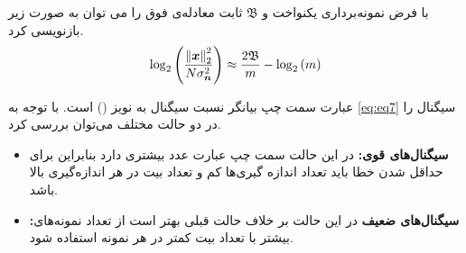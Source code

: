 با فرض نمونه‌برداری یکنواخت و
$ \mathfrak{B} $
ثابت معادله‌ی فوق را می توان به صورت زیر بازنویسی کرد.
\begin{align}
\label{eq:eq8}
\log_{2}\left( \dfrac{\left\lVert\bm{x}\right\rVert_{2}^{2}}{N \sigma^{2}_{\bm{n}}}\right)\approx \dfrac{2\mathfrak{B}}{m}-\log_{2}\left(m\right)
\end{align}

عبارت سمت چپ بیانگر نسبت سیگنال به نویز
()
است. با توجه به 
\eqref{eq:eq7}
سیگنال را در دو حالت مختلف می‌توان بررسی کرد.
\begin{itemize}
\item{
\textbf{سیگنال‌های قوی:}
در این حالت سمت چپ عبارت عدد بیشتری دارد بنابراین برای حداقل شدن خطا باید تعداد اندازه گیری‌ها کم و تعداد بیت در هر اندازه‌گیری بالا باشد. 
}
\item{
\textbf{:سیگنال‌های ضعیف}
در این حالت بر خلاف حالت قبلی بهتر است از تعداد نمونه‌های بیشتر با تعداد بیت کمتر در هر نمونه استفاده شود.
}
\end{itemize}

